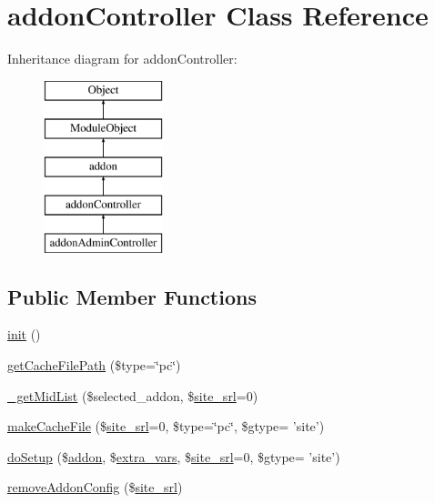 \hypertarget{classaddonController}{\section{addon\+Controller Class Reference}
\label{classaddonController}
}
Inheritance diagram for addon\+Controller\+:\begin{figure}[H]
\begin{center}
\leavevmode
\includegraphics[height=5.000000cm]{classaddonController}
\end{center}
\end{figure}
\subsection*{Public Member Functions}
\begin{DoxyCompactItemize}
\item 
\hyperlink{classaddonController_a11ede7aecba420c2a5c7e55d8bab4013}{init} ()
\item 
\hyperlink{classaddonController_aaad3343ec8471cab540db6ebde4c06bd}{get\+Cache\+File\+Path} (\$type=\char`\"{}pc\char`\"{})
\item 
\hyperlink{classaddonController_a7a1ed742a1dd2c4f71e56acafe31c13d}{\+\_\+get\+Mid\+List} (\$selected\+\_\+addon, \$\hyperlink{ko_8install_8php_a8b1406b4ad1048041558dce6bfe89004}{site\+\_\+srl}=0)
\item 
\hyperlink{classaddonController_ad0f567db4f461bb5d2d6449b38f261ed}{make\+Cache\+File} (\$\hyperlink{ko_8install_8php_a8b1406b4ad1048041558dce6bfe89004}{site\+\_\+srl}=0, \$type=\char`\"{}pc\char`\"{}, \$gtype= 'site')
\item 
\hyperlink{classaddonController_a029f47b2dc77ada00e12e6323039ebdb}{do\+Setup} (\$\hyperlink{classaddon}{addon}, \$\hyperlink{ko_8install_8php_ae1dcb37fc34a8f312d2e6abd6f806743}{extra\+\_\+vars}, \$\hyperlink{ko_8install_8php_a8b1406b4ad1048041558dce6bfe89004}{site\+\_\+srl}=0, \$gtype= 'site')
\item 
\hyperlink{classaddonController_ad90c76bfd8351152d3d69b287c606fe5}{remove\+Addon\+Config} (\$\hyperlink{ko_8install_8php_a8b1406b4ad1048041558dce6bfe89004}{site\+\_\+srl})
\end{DoxyCompactItemize}
